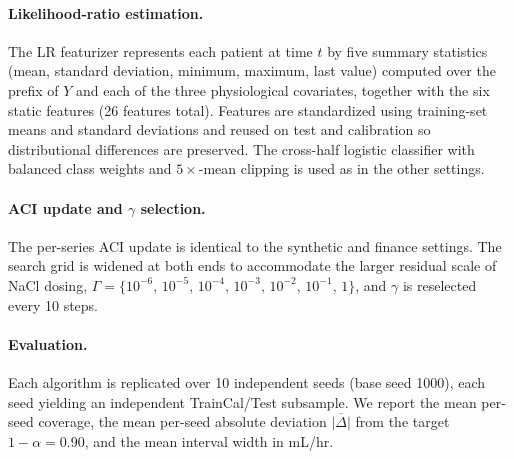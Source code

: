 \paragraph{Likelihood-ratio estimation.}
The LR featurizer represents each patient at time $t$ by five summary
statistics (mean, standard deviation, minimum, maximum, last value) computed
over the prefix of $Y$ and each of the three physiological covariates,
together with the six static features (26 features total).  Features are
standardized using training-set means and standard deviations and reused on
test and calibration so distributional differences are preserved.  The
cross-half logistic classifier with balanced class weights and $5\times$-mean
clipping is used as in the other settings.

\paragraph{ACI update and $\gamma$ selection.}
The per-series ACI update is identical to the synthetic and finance
settings.  The search grid is widened at both ends to accommodate the larger
residual scale of NaCl dosing,
$\Gamma = \{10^{-6},\, 10^{-5},\, 10^{-4},\, 10^{-3},\,
10^{-2},\, 10^{-1},\, 1\}$,
and $\gamma$ is reselected every 10 steps.

\paragraph{Evaluation.}
Each algorithm is replicated over 10 independent seeds (base seed 1000),
each seed yielding an independent TrainCal/Test subsample.  We report the
mean per-seed coverage, the mean per-seed absolute deviation
$\overline{|\Delta|}$ from the target $1-\alpha = 0.90$, and the mean
interval width in mL/hr.


